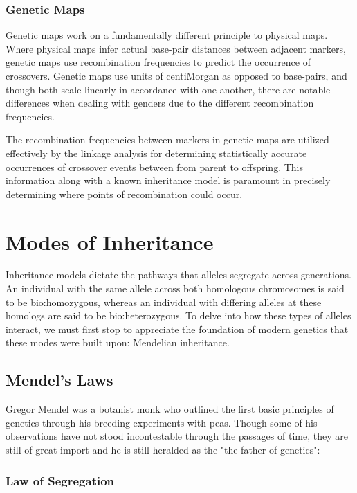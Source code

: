 \subsubsection{Genetic Maps}

Genetic maps work on a fundamentally different principle to physical maps. Where physical maps infer actual base-pair distances between adjacent markers, genetic maps use recombination frequencies to predict the occurrence of crossovers. Genetic maps use units of centiMorgan as opposed to base-pairs, and though both scale linearly in accordance with one another, there are notable differences when dealing with genders due to the different recombination frequencies. 

The recombination frequencies between markers in genetic maps are utilized effectively by the linkage analysis for determining statistically accurate occurrences of crossover events between from parent to offspring. This information along with a known inheritance model is paramount in precisely determining where points of recombination could occur.


\section{Modes of Inheritance}

Inheritance models dictate the pathways that alleles segregate across generations.  An individual with the same allele across both homologous chromosomes is said to be \gls{bio:homozygous}, whereas an individual with differing alleles at these homologs are said to be \gls{bio:heterozygous}. To delve into how these types of alleles interact, we must first stop to appreciate the foundation of modern genetics that these modes were built upon: Mendelian inheritance.

\subsection{Mendel's Laws}

Gregor Mendel was a botanist monk who outlined the first basic principles of genetics through his breeding experiments with peas. Though some of his observations have not stood incontestable through the passages of time, they are still of great import and he is still heralded as the "the father of genetics":

\subsubsection{Law of Segregation}

